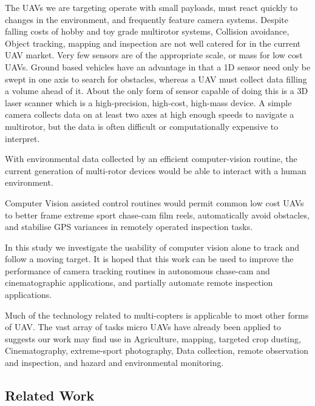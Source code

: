 \documentclass{article}
\begin{document}
      The UAVs we are targeting operate with small payloads, must react quickly to changes in the environment, and frequently feature camera systems.
      Despite falling costs of hobby and toy grade multirotor systems, Collision avoidance, Object tracking, mapping and inspection are not well catered for in the current UAV market.
      Very few sensors are of the appropriate scale, or mass for low cost UAVs.
      Ground based vehicles have an advantage in that a 1D sensor need only be swept in one axis to search for obstacles, whereas a UAV must collect data filling a volume ahead of it. About the only form of sensor capable of doing this is a 3D laser scanner which is a high-precision, high-cost, high-mass device.
      A simple camera collects data on at least two axes at high enough speeds to navigate a multirotor, but the data is often difficult or computationally expensive to interpret.

      With environmental data collected by an efficient computer-vision routine, the current generation of multi-rotor devices would be able to interact with a human environment.

      Computer Vision assisted control routines would permit common low cost UAVs to better frame extreme sport chase-cam film reels, automatically avoid obstacles, and stabilise GPS variances in remotely operated inspection tasks.

      In this study we investigate the usability of computer vision alone to track and follow a moving target.  It is hoped that this work can be used to improve the performance of camera tracking routines in autonomous chase-cam and cinematographic applications, and partially automate remote inspection applications.

      Much of the technology related to multi-copters is applicable to most other forms of UAV.  The vast array of tasks micro UAVs have already been applied to suggests our work may find use in Agriculture, mapping, targeted crop dusting, Cinematography, extreme-sport photography, Data collection, remote observation and inspection, and hazard and environmental monitoring.
    \subsection{Related Work}
\end{document}
